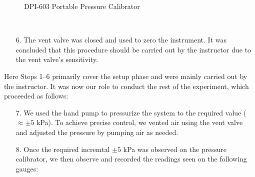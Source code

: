 \documentclass{article}
\begin{document}
\begin{minipage}{0.45\textwidth}
\begin{figure}[H]
		\caption{DPI-603 Portable Pressure Calibrator} 
		\label{fig:DPI-603} 
	\end{figure}
\end{minipage}\\
\begin{enumerate}
\item[6.] The vent valve was closed and used to zero the instrument. It was concluded that this procedure should be carried out by the instructor due to the vent valve’s sensitivity.  
\end{enumerate}
\noindent
Here Steps 1–6 primarily cover the setup phase and were mainly carried out by the instructor. It was now our role to conduct the rest of the experiment, which proceeded as follows:

\begin{enumerate}
\item[7.] We used the hand pump to pressurize the system to the required value ($\approx\pm 5$ kPa). To achieve precise control, we vented air using the vent valve and adjusted the pressure by pumping air as needed.
\item[8.] Once the required incremtal $\pm 5$ kPa was observed on the pressure calibrator, we then observe and recorded the readings seen on the following gauges:
\end{enumerate}
\end{document}
